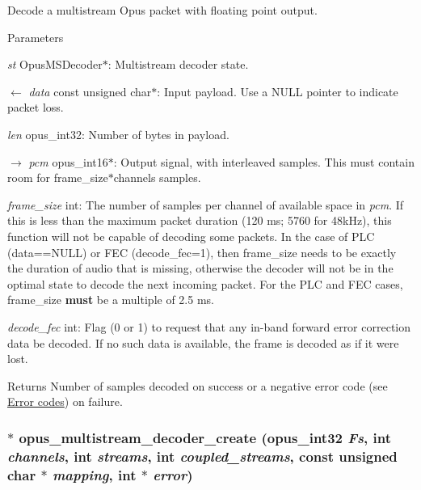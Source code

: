 Decode a multistream Opus packet with floating point output. 
\begin{DoxyParams}{Parameters}
\item[{\em st}]{\ttfamily OpusMSDecoder$\ast$}: Multistream decoder state. \item[\mbox{$\leftarrow$} {\em data}]{\ttfamily const unsigned char$\ast$}: Input payload. Use a {\ttfamily NULL} pointer to indicate packet loss. \item[{\em len}]{\ttfamily opus\_\-int32}: Number of bytes in payload. \item[\mbox{$\rightarrow$} {\em pcm}]{\ttfamily opus\_\-int16$\ast$}: Output signal, with interleaved samples. This must contain room for {\ttfamily frame\_\-size$\ast$channels} samples. \item[{\em frame\_\-size}]{\ttfamily int}: The number of samples per channel of available space in {\itshape pcm\/}. If this is less than the maximum packet duration (120 ms; 5760 for 48kHz), this function will not be capable of decoding some packets. In the case of PLC (data==NULL) or FEC (decode\_\-fec=1), then frame\_\-size needs to be exactly the duration of audio that is missing, otherwise the decoder will not be in the optimal state to decode the next incoming packet. For the PLC and FEC cases, frame\_\-size {\bfseries must} be a multiple of 2.5 ms. \item[{\em decode\_\-fec}]{\ttfamily int}: Flag (0 or 1) to request that any in-\/band forward error correction data be decoded. If no such data is available, the frame is decoded as if it were lost. \end{DoxyParams}
\begin{DoxyReturn}{Returns}
Number of samples decoded on success or a negative error code (see \hyperlink{group__opus__errorcodes}{Error codes}) on failure. 
\end{DoxyReturn}
\hypertarget{group__opus__multistream_ga3c0e342774174c471e61cedba53755c9}{
\subsubsection[{opus\_\-multistream\_\-decoder\_\-create}]{$\ast$ opus\_\-multistream\_\-decoder\_\-create ({\bf opus\_\-int32} {\em Fs}, \/  int {\em channels}, \/  int {\em streams}, \/  int {\em coupled\_\-streams}, \/  const unsigned char $\ast$ {\em mapping}, \/  int $\ast$ {\em error})}}
\label{group__opus__multistream_ga3c0e342774174c471e61cedba53755c9}


